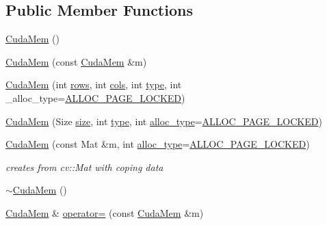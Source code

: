 \subsection*{Public Member Functions}
\begin{DoxyCompactItemize}
\item 
\hyperlink{classcv_1_1gpu_1_1CudaMem_af64b7183b037a8bc2f5288233e57e393}{Cuda\-Mem} ()
\item 
\hyperlink{classcv_1_1gpu_1_1CudaMem_abc79c3adc057862e870265929d535483}{Cuda\-Mem} (const \hyperlink{classcv_1_1gpu_1_1CudaMem}{Cuda\-Mem} \&m)
\item 
\hyperlink{classcv_1_1gpu_1_1CudaMem_aff2e897c97fe518dae437944fc893234}{Cuda\-Mem} (int \hyperlink{classcv_1_1gpu_1_1CudaMem_a7a9d3e9cac593f025c71e86a4e855f15}{rows}, int \hyperlink{classcv_1_1gpu_1_1CudaMem_ac0ebd6815d262974d6fb1b6fa79fe360}{cols}, int \hyperlink{classcv_1_1gpu_1_1CudaMem_a9c4563cc629d2ccbe8397f85015db109}{type}, int \-\_\-alloc\-\_\-type=\hyperlink{classcv_1_1gpu_1_1CudaMem_a1bb680556fac1e3a41bd00e1c8cf6818a766dff008ee80639564c9ceaa7b2936b}{A\-L\-L\-O\-C\-\_\-\-P\-A\-G\-E\-\_\-\-L\-O\-C\-K\-E\-D})
\item 
\hyperlink{classcv_1_1gpu_1_1CudaMem_a764c3628090fd50efa6dcf425bd77139}{Cuda\-Mem} (Size \hyperlink{classcv_1_1gpu_1_1CudaMem_a5d79b4ec776ed1de0053ecd30b7b8b73}{size}, int \hyperlink{classcv_1_1gpu_1_1CudaMem_a9c4563cc629d2ccbe8397f85015db109}{type}, int \hyperlink{classcv_1_1gpu_1_1CudaMem_a253dcb37318ea0b109dca064678b88e0}{alloc\-\_\-type}=\hyperlink{classcv_1_1gpu_1_1CudaMem_a1bb680556fac1e3a41bd00e1c8cf6818a766dff008ee80639564c9ceaa7b2936b}{A\-L\-L\-O\-C\-\_\-\-P\-A\-G\-E\-\_\-\-L\-O\-C\-K\-E\-D})
\item 
\hyperlink{classcv_1_1gpu_1_1CudaMem_abe1d6aa0602f94c466e8962503cc47ed}{Cuda\-Mem} (const Mat \&m, int \hyperlink{classcv_1_1gpu_1_1CudaMem_a253dcb37318ea0b109dca064678b88e0}{alloc\-\_\-type}=\hyperlink{classcv_1_1gpu_1_1CudaMem_a1bb680556fac1e3a41bd00e1c8cf6818a766dff008ee80639564c9ceaa7b2936b}{A\-L\-L\-O\-C\-\_\-\-P\-A\-G\-E\-\_\-\-L\-O\-C\-K\-E\-D})
\begin{DoxyCompactList}\small\item\em creates from cv\-::\-Mat with coping data \end{DoxyCompactList}\item 
\hyperlink{classcv_1_1gpu_1_1CudaMem_a68a8120604fc76aa0dac9ce6aa8eb8ed}{$\sim$\-Cuda\-Mem} ()
\item 
\hyperlink{classcv_1_1gpu_1_1CudaMem}{Cuda\-Mem} \& \hyperlink{classcv_1_1gpu_1_1CudaMem_ac5027a560f7ca05a50320348584713b2}{operator=} (const \hyperlink{classcv_1_1gpu_1_1CudaMem}{Cuda\-Mem} \&m)

\end{DoxyCompactItemize}
